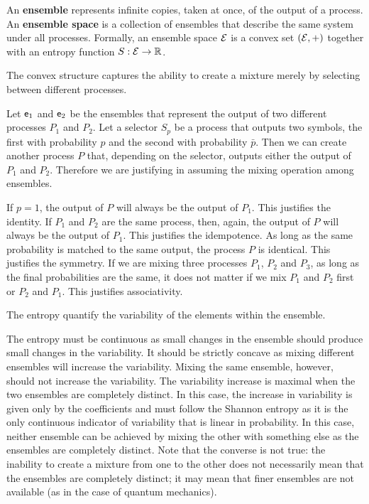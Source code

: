 \begin{defn}
	An \textbf{ensemble} represents infinite copies, taken at once, of the output of a process. An \textbf{ensemble space} is a collection of ensembles that describe the same system under all processes. Formally, an ensemble space $\mathcal{E}$ is a convex set $(\mathcal{E}, +)$ together with an entropy function $S : \mathcal{E} \to \mathbb{R}$.
\end{defn}
\begin{justification}
	The convex structure captures the ability to create a mixture merely by selecting between different processes.
	
	Let $\mathsf{e}_1$ and $\mathsf{e}_2$ be the ensembles that represent the output of two different processes $P_1$ and $P_2$. Let a selector $S_p$ be a process that outputs two symbols, the first with probability $p$ and the second with probability $\bar{p}$. Then we can create another process $P$ that, depending on the selector, outputs either the output of $P_1$ and $P_2$. Therefore we are justifying in assuming the mixing operation among ensembles.
	
	If $p=1$, the output of $P$ will always be the output of $P_1$. This justifies the identity. If $P_1$ and $P_2$ are the same process, then, again, the output of $P$ will always be the output of $P_1$. This justifies the idempotence. As long as the same probability is matched to the same output, the process $P$ is identical. This justifies the symmetry. If we are mixing three processes $P_1$, $P_2$ and $P_3$, as long as the final probabilities are the same, it does not matter if we mix $P_1$ and $P_2$ first or $P_2$ and $P_1$. This justifies associativity.
	
	The entropy quantify the variability of the elements within the ensemble.
	
	The entropy must be continuous as small changes in the ensemble should produce small changes in the variability. It should be strictly concave as mixing different ensembles will increase the variability. Mixing the same ensemble, however, should not increase the variability. The variability increase is maximal when the two ensembles are completely distinct. In this case, the increase in variability is given only by the coefficients and must follow the Shannon entropy as it is the only continuous indicator of variability that is linear in probability. In this case, neither ensemble can be achieved by mixing the other with something else as the ensembles are completely distinct. Note that the converse is not true: the inability to create a mixture from one to the other does not necessarily mean that the ensembles are completely distinct; it may mean that finer ensembles are not available (as in the case of quantum mechanics).
	
\end{justification}

